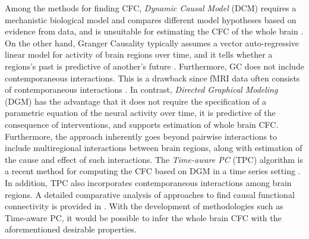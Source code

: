 \documentclass[12pt,reqno]{amsart}
\theoremstyle{definition}
\begin{document}
Among the methods for finding CFC, \emph{Dynamic Causal Model} (DCM) requires a mechanistic biological model and compares different model hypotheses based on evidence from data, and is unsuitable for estimating the CFC of the whole brain \citep{friston2003dynamic, smith2011network}. On the other hand, Granger Causality typically assumes a vector auto-regressive linear model for activity of brain regions over time, and it tells whether a regions's past is predictive of another's future \citep{granger2001essays}. Furthermore, GC does not include contemporaneous interactions. This is a drawback since fMRI data often consists of contemporaneous interactions \citep{smith2011network}. In contrast, \emph{Directed Graphical Modeling} (DGM) has the advantage that it does not require the specification of a parametric equation of the neural activity over time, it is predictive of the consequence of interventions, and supports estimation of whole brain CFC. Furthermore, the approach inherently goes beyond pairwise interactions to include multiregional interactions between brain regions, along with estimation of the cause and effect of such interactions. The \emph{Time-aware PC} (TPC) algorithm is a recent method for computing the CFC based on DGM in a time series setting \citep{biswas2022statistical2}. In addition, TPC also incorporates contemporaneous interactions among brain regions. A detailed comparative analysis of approaches to find causal functional connectivity is provided in \citet{biswas2021statistical, biswas2022statistical2}. With the development of methodologies such as Time-aware PC, it would be possible to infer the whole brain CFC with the aforementioned desirable properties.
\end{document}
